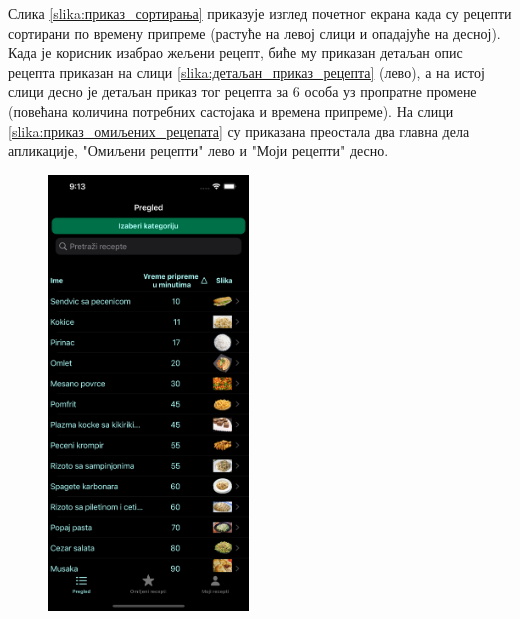 \documentclass[12pt,oneside]{memoir}
\begin{document}
\indent Слика \ref{slika:приказ_сортирања} приказује изглед почетног екрана када су рецепти сортирани по времену припреме (растуће на левој слици и опадајуће на десној). Када је корисник изабрао жељени рецепт, биће му приказан детаљан опис рецепта приказан на слици \ref{slika:детаљан_приказ_рецепта} (лево), а на истој слици десно је детаљан приказ тог рецепта за 6 особа уз пропратне промене (повећана количина потребних састојака и времена припреме). На слици \ref{slika:приказ_омиљених_рецепата} су приказана преостала два главна дела апликације, "Омиљени рецепти" лево и "Моји рецепти" десно.

\begin{figure} [H]
    \centering
    \captionsetup{justification=centering}
    \includegraphics[width=0.475\textwidth]{images/simulators/testing images/sorting asc.png}
    \hfill

\end{figure}
\end{document}
